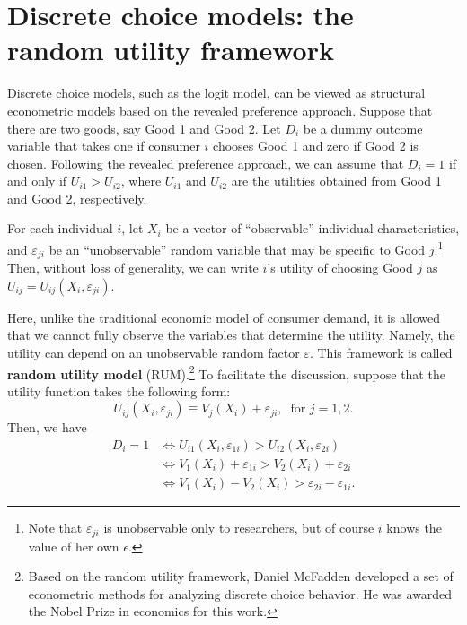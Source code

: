 \documentclass[10.5pt, A4paper, openany, uplatex]{book}
\newcommand{\eps}{\varepsilon}
\numberwithin{equation}{section}
\begin{document}
\section{Discrete choice models: the random utility framework}

Discrete choice models, such as the logit model, can be viewed as structural econometric models based on the revealed preference approach.
Suppose that there are two goods, say Good 1 and Good 2.
Let $D_i$ be a dummy outcome variable that takes one if consumer $i$ chooses Good 1 and zero if Good 2 is chosen.
Following the revealed preference approach, we can assume that $D_i = 1$ if and only if $U_{i1} > U_{i2}$, where $U_{i1}$ and $U_{i2}$ are the utilities obtained from Good 1 and Good 2, respectively.

For each individual $i$, let $X_i$ be a vector of ``observable'' individual characteristics, and $\eps_{ji}$ be an ``unobservable'' random variable that may be specific to Good $j$.\footnote{
	Note that $\eps_{ji}$ is unobservable only to researchers, but of course $i$ knows the value of her own $\epsilon$.
	}
Then, without loss of generality, we can write $i$'s utility of choosing Good $j$ as $U_{ij} = U_{ij}(X_i, \eps_{ji})$.

Here, unlike the traditional economic model of consumer demand, it is allowed that we cannot fully observe the variables that determine the utility.
Namely, the utility can depend on an unobservable random factor $\eps$.
This framework is called \textbf{random utility model} (RUM).\footnote{
	Based on the random utility framework, Daniel McFadden developed a set of econometric methods for analyzing discrete choice behavior. 
	He was awarded the Nobel Prize in economics for this work.
	}
To facilitate the discussion, suppose that the utility function takes the following form:
\[
	U_{ij}(X_i, \eps_{ji}) \equiv V_j(X_i) + \eps_{ji}, \;\; \text{for $j = 1,2$}.
\]
Then, we have
\begin{align*}
	D_i = 1
	& \iff U_{i1}(X_i, \eps_{1i}) > U_{i2}(X_i, \eps_{2i}) \\
	& \iff  V_1(X_i) + \eps_{1i} >  V_2(X_i) + \eps_{2i} \\
	& \iff  V_1(X_i) - V_2(X_i) > \eps_{2i} - \eps_{1i}.
\end{align*}
\end{document}
